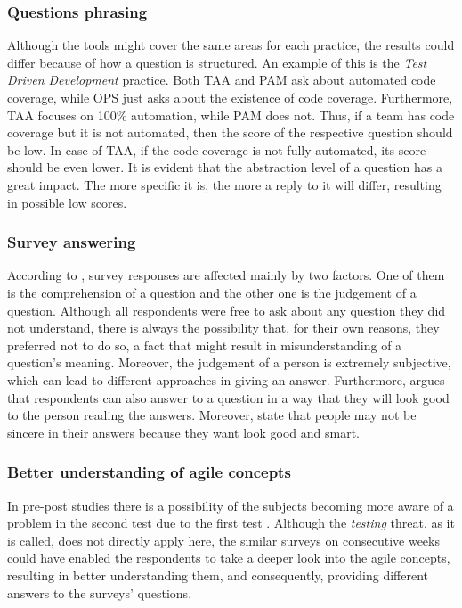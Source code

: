 \subsubsection{Questions phrasing}
Although the tools might cover the same areas for each practice, the results could differ because of how a question is structured. An example of this is the \textit{Test Driven Development} practice. Both \ac{TAA} and \ac{PAM} ask about automated code coverage, while \ac{OPS} just asks about the existence of code coverage. Furthermore, \ac{TAA} focuses on 100\% automation, while \ac{PAM} does not. Thus, if a team has code coverage but it is not automated, then the score of the respective question should be low. In case of \ac{TAA}, if the code coverage is not fully automated, its score should be even lower. It is evident that the abstraction level of a question has a great impact. The more specific it is, the more a reply to it will differ, resulting in possible low scores.

\subsubsection{Survey answering}
According to \citet{Wagner_Zeglovits}, survey responses are affected mainly by two factors. One of them is the comprehension of a question and the other one is the judgement of a question. Although all respondents were free to ask about any question they did not understand, there is always the possibility that, for their own reasons, they preferred not to do so, a fact that might result in misunderstanding of a question's meaning. Moreover, the judgement of a person is extremely subjective, which can lead to different approaches in giving an answer. Furthermore, \citet{Floyd_Fowler} argues that respondents can also answer to a question in a way that they will look good to the person reading the answers. Moreover, \citet{feldt_angelis_torkar_samuelsson} state that people may not be sincere in their answers because they want look good and smart. 

\subsubsection{Better understanding of agile concepts}
In pre-post studies there is a possibility of the subjects becoming more aware of a problem in the second test due to the first test \cite{Campbell_Stanley}. Although the \textit{testing} threat, as it is called, does not directly apply here, the similar surveys on consecutive weeks could have enabled the respondents to take a deeper look into the agile concepts, resulting in better understanding them, and consequently, providing different answers to the surveys' questions. 

